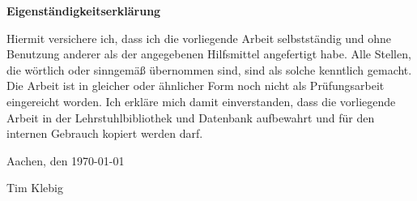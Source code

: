 \Large
\textbf{Eigenständigkeitserklärung}

\normalsize
Hiermit versichere ich, dass ich die vorliegende Arbeit selbstständig und ohne Benutzung anderer als der angegebenen Hilfsmittel angefertigt habe. Alle Stellen, die wörtlich oder sinngemäß übernommen sind, sind als solche kenntlich gemacht. Die Arbeit ist in gleicher oder ähnlicher Form noch nicht als Prüfungsarbeit eingereicht worden. Ich erkläre mich damit einverstanden, dass die vorliegende Arbeit in der Lehrstuhlbibliothek und Datenbank aufbewahrt und für den internen Gebrauch kopiert werden darf. \newline \newline


Aachen, den \today \newline \newline

Tim Klebig
